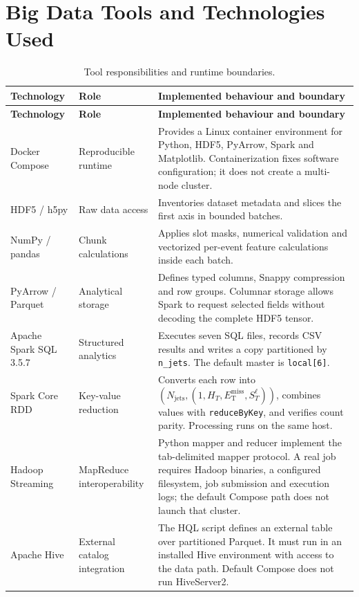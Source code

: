 \documentclass[11pt,a4paper]{article}
\newcommand{\met}{E_{\mathrm{T}}^{\mathrm{miss}}}
\newcommand{\njet}{N_{\mathrm{jets}}}
\begin{document}
\section{Big Data Tools and Technologies Used}

\begin{longtable}{>{\raggedright\arraybackslash}p{2.45cm} >{\raggedright\arraybackslash}p{2.35cm} >{\raggedright\arraybackslash}p{8.45cm}}
\caption{Tool responsibilities and runtime boundaries.}\label{tab:tools}\\
\toprule\textbf{Technology} & \textbf{Role} & \textbf{Implemented behaviour and boundary} \\
\midrule\endfirsthead
\toprule\textbf{Technology} & \textbf{Role} & \textbf{Implemented behaviour and boundary} \\
\midrule\endhead
Docker Compose & Reproducible runtime & Provides a Linux container environment for Python, HDF5, PyArrow, Spark and Matplotlib. Containerization fixes software configuration; it does not create a multi-node cluster. \\
HDF5 / h5py & Raw data access & Inventories dataset metadata and slices the first axis in bounded batches. \\
NumPy / pandas & Chunk calculations & Applies slot masks, numerical validation and vectorized per-event feature calculations inside each batch. \\
PyArrow / Parquet & Analytical storage & Defines typed columns, Snappy compression and row groups. Columnar storage allows Spark to request selected fields without decoding the complete HDF5 tensor. \\
Apache Spark SQL 3.5.7 & Structured analytics & Executes seven SQL files, records CSV results and writes a copy partitioned by \texttt{n\_jets}. The default master is \texttt{local[6]}. \\
Spark Core RDD & Key-value reduction & Converts each row into \((\njet,(1,H_T,\met,S_T^{\ell}))\), combines values with \texttt{reduceByKey}, and verifies count parity. Processing runs on the same host. \\
Hadoop Streaming & MapReduce interoperability & Python mapper and reducer implement the tab-delimited mapper protocol. A real job requires Hadoop binaries, a configured filesystem, job submission and execution logs; the default Compose path does not launch that cluster. \\
Apache Hive & External catalog integration & The HQL script defines an external table over partitioned Parquet. It must run in an installed Hive environment with access to the data path. Default Compose does not run HiveServer2. \\

\end{longtable}
\end{document}
